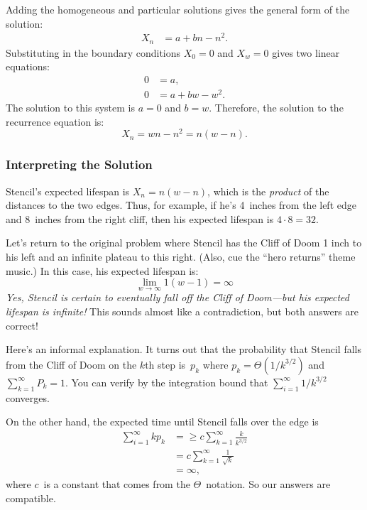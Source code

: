 Adding the homogeneous and particular solutions gives the general form
of the solution:
%
\begin{align*}
    X_n & = a + b n - n^2.
\end{align*}
%
Substituting in the boundary conditions $X_0 = 0$ and $X_w = 0$ gives
two linear equations:
%
\begin{align*}
0 & = a, \\
0 & = a + b w - w^2.
\end{align*}
%
The solution to this system is $a = 0$ and $b = w$.  Therefore, the
solution to the recurrence equation is:
%
\[
X_n = w n - n^2 = n (w - n).
\]

\subsubsection{Interpreting the Solution}

Stencil's expected lifespan is $X_n = n (w - n)$, which is the
\emph{product} of the distances to the two edges.  Thus, for example,
if he's 4~inches from the left edge and 8~inches from the right cliff,
then his expected lifespan is $4 \cdot 8 = 32$.

Let's return to the original problem where Stencil has the Cliff of
Doom 1 inch to his left and an infinite plateau to this right.  (Also,
cue the ``hero returns'' theme music.)  In this case, his expected
lifespan is:
%
\[
\lim_{w \to \infty} 1 (w - 1) = \infty
\]
%
\emph{Yes, Stencil is certain to eventually fall off the Cliff of
  Doom---but his expected lifespan is infinite!}  This sounds almost
like a contradiction, but both answers are correct!

Here's an informal explanation.  It turns out that the probability
that Stencil falls from the Cliff of Doom on the $k$th step is~$p_k$
where $p_k = \Theta(1/k^{3/2})$ and $\sum_{k = 1}^\infty P_k = 1$.
You can verify by the integration bound that $\sum_{i = 1}^\infty
1/k^{3/2}$ converges.

On the other hand, the expected time until Stencil falls over the edge
is
\begin{align*}
\sum_{i = 1}^\infty k p_k
    &= \ge c \sum_{k = 1}^\infty \frac{k}{k^{3/2}} \\
    &=     c \sum_{k = 1}^\infty \frac{1}{\sqrt{k}} \\
    &=     \infty,
\end{align*}
where $c$~is a constant that comes from the $\Theta$~notation.  So our
answers are compatible.

